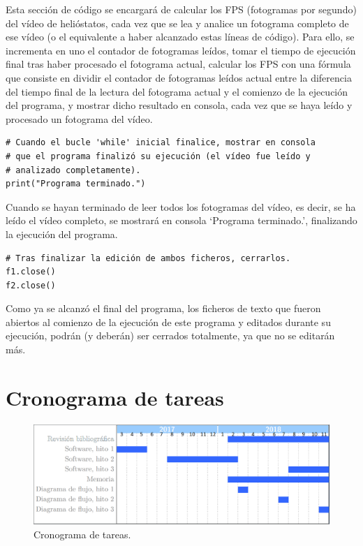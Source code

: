 Esta sección de código se encargará de calcular los FPS (fotogramas por segundo) del vídeo de helióstatos, cada vez que se lea y analice un fotograma completo de ese vídeo (o el equivalente a haber alcanzado estas líneas de código). Para ello, se incrementa en uno el contador de fotogramas leídos, tomar el tiempo de ejecución final tras haber procesado el fotograma actual, calcular los FPS con una fórmula que consiste en dividir el contador de fotogramas leídos actual entre la diferencia del tiempo final de la lectura del fotograma actual y el comienzo de la ejecución del programa, y mostrar dicho resultado en consola, cada vez que se haya leído y procesado un fotograma del vídeo.

\begin{lstlisting}
# Cuando el bucle 'while' inicial finalice, mostrar en consola
# que el programa finalizó su ejecución (el vídeo fue leído y
# analizado completamente).
print("Programa terminado.")
\end{lstlisting}

Cuando se hayan terminado de leer todos los fotogramas del vídeo, es decir, se ha leído el vídeo completo, se mostrará en consola ‘Programa terminado.’, finalizando la ejecución del programa.

\begin{lstlisting}
# Tras finalizar la edición de ambos ficheros, cerrarlos.
f1.close()
f2.close()
\end{lstlisting}

Como ya se alcanzó el final del programa, los ficheros de texto que fueron abiertos al comienzo de la ejecución de este programa y editados durante su ejecución, podrán (y deberán) ser cerrados totalmente, ya que no se editarán más.



\section{Cronograma de tareas}

\begin{figure}[h!]
  	\centering
	\includegraphics[width=\textwidth]{CronogramaTareas/cronogramaTareas.PNG}
	\caption{Cronograma de tareas.
	\label{fig:CronogramaTareas/cronogramaTareas.PNG}}
\end{figure}

